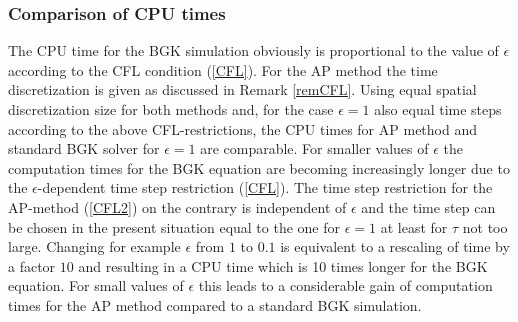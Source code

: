 \documentclass[final,11pt]{siamart251216}
\numberwithin{equation}{section}
\theoremstyle{definition}
\theoremstyle{remark}
\begin{document}
\subsubsection{Comparison of CPU times}
	The CPU time for the BGK simulation obviously is proportional   to the value of $\epsilon$ according to the CFL condition
	(\ref{CFL}). 
For the AP method the time discretization is given as discussed in Remark \ref{remCFL}.
Using  equal spatial discretization size for both methods and, for the case  $\epsilon=1$ also equal time steps according to the above CFL-restrictions,  the CPU times for AP method  and standard BGK solver  for $\epsilon=1$  are comparable. 
	For  smaller values of $\epsilon$ the computation times for the BGK equation are becoming increasingly longer
	due to the $\epsilon$-dependent time step restriction (\ref{CFL}). The time step restriction for the AP-method 
	 (\ref{CFL2}) on the contrary is independent of $\epsilon$ and the time step can be chosen in the present situation equal to the one for $\epsilon=1$ at least for $\tau $ not too large.
	Changing for example  $\epsilon$ from $1$ to $0.1$ is equivalent to a rescaling of time by a factor $10$ and resulting in a CPU time which is 10 times longer for the BGK equation. 
	For small values of $\epsilon$  this leads to a considerable gain of computation times
	for the AP method  compared to a standard BGK simulation.  
	
\end{document}
